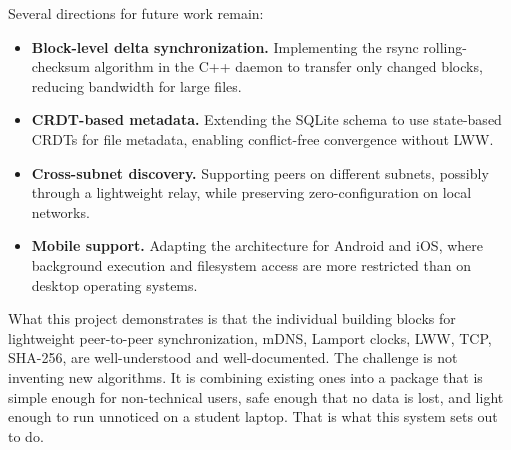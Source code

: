 Several directions for future work remain:

\begin{itemize}
    \item \textbf{Block-level delta synchronization.} Implementing the rsync rolling-checksum algorithm in the C++ daemon to transfer only changed blocks, reducing bandwidth for large files.
    \item \textbf{CRDT-based metadata.} Extending the SQLite schema to use state-based CRDTs for file metadata, enabling conflict-free convergence without LWW.
    \item \textbf{Cross-subnet discovery.} Supporting peers on different subnets, possibly through a lightweight relay, while preserving zero-configuration on local networks.
    \item \textbf{Mobile support.} Adapting the architecture for Android and iOS, where background execution and filesystem access are more restricted than on desktop operating systems.
\end{itemize}

What this project demonstrates is that the individual building blocks for lightweight peer-to-peer synchronization, mDNS, Lamport clocks, LWW, TCP, SHA-256, are well-understood and well-documented. The challenge is not inventing new algorithms. It is combining existing ones into a package that is simple enough for non-technical users, safe enough that no data is lost, and light enough to run unnoticed on a student laptop. That is what this system sets out to do.
